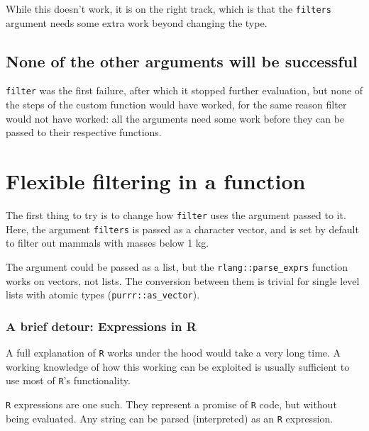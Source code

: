 \documentclass[]{book}
\begin{document}
While this doesn't work, it is on the right track, which is that the \texttt{filters} argument needs some extra work beyond changing the type.

\hypertarget{none-of-the-other-arguments-will-be-successful}{%
\subsection{None of the other arguments will be successful}\label{none-of-the-other-arguments-will-be-successful}}

\texttt{filter} was the first failure, after which it stopped further evaluation, but none of the steps of the custom function would have worked, for the same reason filter would not have worked: all the arguments need some work before they can be passed to their respective functions.

\hypertarget{flexible-filtering-in-a-function}{%
\section{Flexible filtering in a function}\label{flexible-filtering-in-a-function}}

The first thing to try is to change how \texttt{filter} uses the argument passed to it.
Here, the argument \texttt{filters} is passed as a character vector, and is set by default to filter out mammals with masses below 1 kg.

The argument could be passed as a list, but the \texttt{rlang::parse\_exprs} function works on vectors, not lists. The conversion between them is trivial for single level lists with atomic types (\texttt{purrr::as\_vector}).

\hypertarget{a-brief-detour-expressions-in-r}{%
\subsubsection*{A brief detour: Expressions in R}\label{a-brief-detour-expressions-in-r}}

A full explanation of \texttt{R} works under the hood would take a very long time. A working knowledge of how this working can be exploited is usually sufficient to use most of \texttt{R}'s functionality.

\texttt{R} expressions are one such. They represent a promise of \texttt{R} code, but without being evaluated. Any string can be parsed (interpreted) as an \texttt{R} expression.
\end{document}
